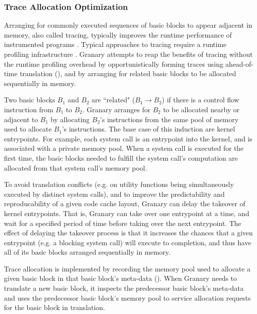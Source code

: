 \documentclass[preprint]{sigplanconf}
\begin{document}
\subsubsection{Trace Allocation Optimization}\label{sec:trace_alloc}
Arranging for commonly executed sequences of basic blocks to appear adjacent in memory, also called tracing, typically improves the runtime performance of instrumented programs \cite{DynamoRIO}. Typical approaches to tracing require a runtime profiling infrastructure \cite{DynamoRIOOptimization}. Granary attempts to reap the benefits of tracing without the runtime profiling overhead by opportunistically forming traces using ahead-of-time translation (), and by arranging for related basic blocks to be allocated sequentially in memory.

Two basic blocks $B_1$ and $B_2$ are ``related" ($B_1 \to B_2$) if there is a control flow instruction from $B_1$ to $B_2$. Granary arranges for $B_2$ to be allocated nearby or adjacent to $B_1$ by allocating $B_2$'s instructions from the same pool of memory used to allocate $B_1$'s instructions. The base case of this induction are kernel entrypoints. For example, each system call is an entrypoint into the kernel, and is associated with a private memory pool. When a system call is executed for the first time, the basic blocks needed to fulfill the system call's computation are allocated from that system call's memory pool.

To avoid translation conflicts (e.g. on utility functions being simultaneously executed by distinct system calls), and to improve the predictability and reproducability of a given code cache layout, Granary can delay the takeover of kernel entrypoints. That is, Granary can take over one entrypoint at a time, and wait for a specified period of time before taking over the next entrypoint. The effect of delaying the takeover process is that it increases the chances that a given entrypoint (e.g. a blocking system call) will execute to completion, and thus have all of its basic blocks  arranged sequentially in memory.

Trace allocation is implemented by recording the memory pool used to allocate a given basic block in that basic block's meta-data (). When Granary needs to translate a new basic block, it inspects the predecessor basic block's meta-data and uses the predecessor basic block's memory pool to service allocation requests for the basic block in translation.
\end{document}
